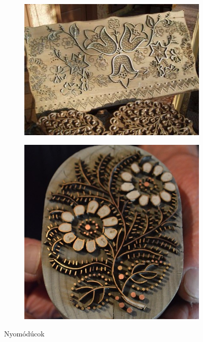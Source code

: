 \begin{figure}[h!]
	\begin{subfigure}[b]{0.2\linewidth}
		\includegraphics[width=\linewidth]{img/fémbőlkészült.jpg}
		\caption{}
	  \end{subfigure}
	  \begin{subfigure}[b]{0.15\linewidth}
		\includegraphics[width=\linewidth]{img/fémből készült 01.jpg}
		\caption{}
	  \end{subfigure}
	\caption{Nyomódúcok}
	\label{fig:duc}
  \end{figure}

